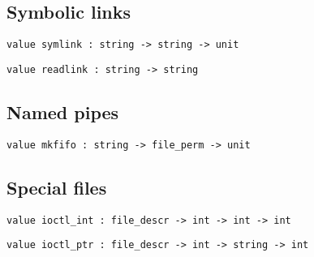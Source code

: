\subsection*{Symbolic links }\begin{verbatim}
value symlink : string -> string -> unit
\end{verbatim}
%
\begin{comment}
 \verbsymlink source dest creates the file \verbdest as a symbolic link
           to the file \verbsource. 
\end{comment}
\begin{verbatim}
value readlink : string -> string
\end{verbatim}
%
\begin{comment}
 Read the contents of a link. 
\end{comment}
\subsection*{Named pipes }\begin{verbatim}
value mkfifo : string -> file_perm -> unit
\end{verbatim}
%
\begin{comment}
 Create a named pipe with the given permissions. 
\end{comment}
\subsection*{Special files }\begin{verbatim}
value ioctl_int : file_descr -> int -> int -> int
\end{verbatim}
%
\begin{comment}
 Interface to \verbioctl in the case where the argument is an
           integer. The first integer argument is the command code;
           the second is the integer parameter. 
\end{comment}
\begin{verbatim}
value ioctl_ptr : file_descr -> int -> string -> int
\end{verbatim}
%
\begin{comment}
 Interface to \verbioctl in the case where the argument is a pointer.
           The integer argument is the command code. A pointer to the string
           argument is passed as argument to the command. The string argument
           is usually set up with the functions from modules \verbpeek and
           \verbpoke. 
\end{comment}
